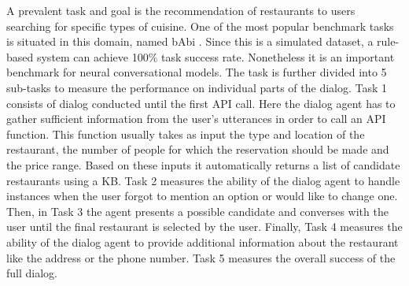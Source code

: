 \documentclass[12pt]{article}
\begin{document}
A prevalent task and goal is the recommendation of restaurants to users searching for specific types of cuisine. One of the most popular benchmark tasks is situated in this domain, named bAbi \cite{Bordes:2016,Joshi:2017,bAbi}. Since this is a simulated dataset, a rule-based system can achieve 100\(\%\) task success rate. Nonetheless it is an important benchmark for neural conversational models. The task is further divided into 5 sub-tasks to measure the performance on individual parts of the dialog. Task 1 consists of dialog conducted until the first API call. Here the dialog agent has to gather sufficient information from the user's utterances in order to call an API function. This function usually takes as input the type and location of the restaurant, the number of people for which the reservation should be made and the price range. Based on these inputs it automatically returns a list of candidate restaurants using a KB. Task 2 measures the ability of the dialog agent to handle instances when the user forgot to mention an option or would like to change one. Then, in Task 3 the agent presents a possible candidate and converses with the user until the final restaurant is selected by the user. Finally, Task 4 measures the ability of the dialog agent to provide additional information about the restaurant like the address or the phone number. Task 5 measures the overall success of the full dialog. 
\end{document}
